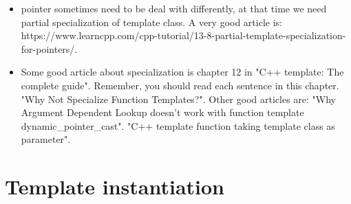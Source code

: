 \documentclass[a4paper,11pt,twoside]{book}
\begin{document}
\begin{itemize}
    \item pointer sometimes need to be deal with differently, at that time we need partial specialization of template class. A very good article is:\\ https://www.learncpp.com/cpp-tutorial/13-8-partial-template-specialization-for-pointers/. 

    \item Some good article about specialization is chapter 12 in "C++ template: The complete guide". Remember, you should read each sentence in this chapter. "Why Not Specialize Function Templates?". Other good articles are: "Why Argument Dependent Lookup doesn't work with function template dynamic\_pointer\_cast". "C++ template function taking template class as parameter".
\end{itemize}


\section{Template instantiation}
\end{document}
